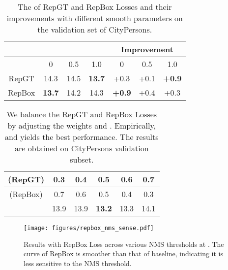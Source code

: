 \documentclass[10pt,twocolumn,letterpaper]{article}
\begin{document}
\begin{table}[!tbp]
\begin{center}
\setlength{\tabcolsep}{5pt}
\begin{tabular}{|c|c|c|c|c|c|c|}
\hline
  & \multicolumn{3}{c|}{} & \multicolumn{3}{c|}{Improvement} \\
\hline
 & 0 & 0.5 & 1.0 & 0 & 0.5 & 1.0 \\
\hline
RepGT & 14.3 & 14.5 & {\bf 13.7} & +0.3 & +0.1 & {\bf +0.9}  \\
\hline
RepBox & {\bf 13.7} & 14.2 & 14.3 & {\bf +0.9} & +0.4 & +0.3  \\
\hline
\end{tabular}
\end{center}
\caption{The  of RepGT and RepBox Losses and their improvements with different smooth parameters  on the validation set of CityPersons.}
\label{tab:citypersons_reasonable_ablation_sigma}
\end{table}

\begin{table}[!tbp]
\begin{center}
\setlength{\tabcolsep}{5pt}
\begin{tabular}{|c|c|c|c|c|c|}
\hline
  (RepGT) & 0.3 & 0.4 & 0.5 & 0.6 & 0.7 \\
\hline
 (RepBox) & 0.7 & 0.6 & 0.5 & 0.4 & 0.3 \\
\hline
 & 13.9 & 13.9 & {\bf 13.2} & 13.3 & 14.1  \\
\hline
\end{tabular}
\end{center}
\caption{We balance the RepGT and RepBox Losses by adjusting the weights  and . Empirically,  and  yields the best performance. The results are obtained on CityPersons validation subset.}
\vspace{-0.2cm}
\label{tab:citypersons_reasonable_ablation_combination}
\end{table}


\begin{figure}[t]
\texttt{[image: figures/repbox\_nms\_sense.pdf]}
\caption{Results with RepBox Loss across various NMS thresholds at . The curve of RepBox is smoother than that of baseline, indicating it is less sensitive to the NMS threshold.}
\vspace{-0.2cm}
\label{fig:RepBox_nms}
\end{figure}
\end{document}
